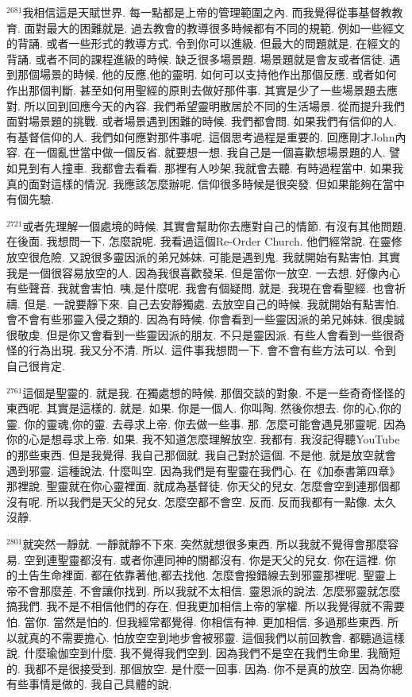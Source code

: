 \documentclass{book}
\begin{document}
$^{2681}$我相信這是天賦世界.
每一點都是上帝的管理範圍之內.
而我覺得從事基督教教育.
面對最大的困難就是.
過去教會的教導很多時候都有不同的規範.
例如一些經文的背誦.
或者一些形式的教導方式.
令到你可以進級.
但最大的問題就是.
在經文的背誦.
或者不同的課程進級的時候.
缺乏很多場景題.
場景題就是會友或者信徒.
遇到那個場景的時候.
他的反應,他的靈明.
如何可以支持他作出那個反應.
或者如何作出那個判斷.
甚至如何用聖經的原則去做好那件事.
其實是少了一些場景題去應對.
所以回到回應今天的內容.
我們希望靈明散居於不同的生活場景.
從而提升我們面對場景題的挑戰.
或者場景遇到困難的時候.
我們都會問.
如果我們有信仰的人.
有基督信仰的人.
我們如何應對那件事呢.
這個思考過程是重要的.
回應剛才John內容.
在一個亂世當中做一個反省.
就要想一想.
我自己是一個喜歡想場景題的人.
譬如見到有人撞車.
我都會去看看.
那裡有人吵架,我就會去聽.
有時過程當中.
如果我真的面對這樣的情況.
我應該怎麼辦呢.
信仰很多時候是很突發.
但如果能夠在當中有個先驗.

$^{2721}$或者先理解一個處境的時候.
其實會幫助你去應對自己的情節.
有沒有其他問題.
在後面.
我想問一下.
怎麼說呢.
我看過這個Re-Order Church.
他們經常說.
在靈修放空很危險.
又說很多靈因派的弟兄姊妹.
可能是遇到鬼.
我就開始有點害怕.
其實我是一個很容易放空的人.
因為我很喜歡發呆.
但是當你一放空.
一去想.
好像內心有些聲音.
我就會害怕.
咦,是什麼呢.
我會有個疑問.
就是.
我現在會看聖經.
也會祈禱.
但是.
一說要靜下來.
自己去安靜獨處.
去放空自己的時候.
我就開始有點害怕.
會不會有些邪靈入侵之類的.
因為有時候.
你會看到一些靈因派的弟兄姊妹.
很虔誠很敬虔.
但是你又會看到一些靈因派的朋友.
不只是靈因派.
有些人會看到一些很奇怪的行為出現.
我又分不清.
所以.
這件事我想問一下.
會不會有些方法可以.
令到自己很肯定.

$^{2761}$這個是聖靈的.
就是我.
在獨處想的時候.
那個交談的對象.
不是一些奇奇怪怪的東西呢.
其實是這樣的.
就是.
如果.
你是一個人.
你叫陶.
然後你想去.
你的心,你的靈.
你的靈魂,你的靈.
去尋求上帝.
你去做一些事.
那.
怎麼可能會遇見邪靈呢.
因為你的心是想尋求上帝.
如果.
我不知道怎麼理解放空.
我都有.
我沒記得聽YouTube的那些東西.
但是我覺得.
我自己那個就.
我自己對於這個.
不是他.
就是放空就會遇到邪靈.
這種說法.
什麼叫空.
因為我們是有聖靈在我們心.
在《加泰書第四章》那裡說.
聖靈就在你心靈裡面.
就成為基督徒.
你天父的兒女.
怎麼會空到連那個都沒有呢.
所以我們是天父的兒女.
怎麼空都不會空.
反而.
反而我都有一點像.
太久沒靜.

$^{2801}$就突然一靜就.
一靜就靜不下來.
突然就想很多東西.
所以我就不覺得會那麼容易.
空到連聖靈都沒有.
或者你連同神的關都沒有.
你是天父的兒女.
你在這裡.
你的土告生命裡面.
都在依靠著他,都去找他.
怎麼會撥錯線去到邪靈那裡呢.
聖靈上帝不會那麼差.
不會讓你找到.
所以我就不太相信.
靈恩派的說法.
怎麼邪靈就怎麼搞我們.
我不是不相信他們的存在.
但我更加相信上帝的掌權.
所以我覺得就不需要怕.
當你.
當然是怕的.
但我經常都覺得.
你相信有神.
更加相信.
多過那些東西.
所以就真的不需要擔心.
怕放空空到地步會被邪靈.
這個我們以前回教會.
都聽過這樣說.
什麼瑜伽空到什麼.
我不覺得我們空到.
因為我們不是空在我們生命里.
我簡短的.
我都不是很接受到.
那個放空.
是什麼一回事.
因為.
你不是真的放空.
因為你總有些事情是做的.
我自己具體的說.
\end{document}
